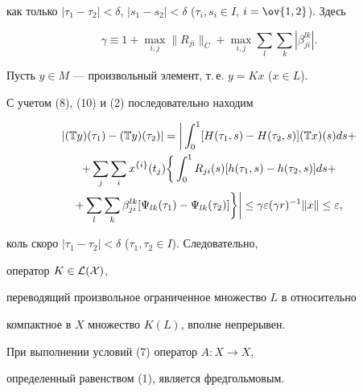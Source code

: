 \begin{pf}
\begin{equation}
\end{equation} 


как только $|\tau_1-\tau_2|<\delta$, $|s_1-s_2|<\delta$ ($\tau_i,s_i\in 


I$, $i=\ov{1,2}$). Здесь 


$$ 


\gamma\equiv 1+\max_{i,j}\|R_{j i}\|_C+\max_{i,j}\sum_l 


\sum_k|\beta^{l k}_{j i}|. 


$$ 


Пусть $y\in M$ --- произвольный элемент, т.\,е. $y=K x$ ($x\in L$). 


С учетом (8), (10) и (2) последовательно находим 


\begin{multline*} 


|(\Bbb T y)(\tau_1)-(\Bbb T y)(\tau_2)|=\bigg|\int^1_0 


[H(\tau_1,s)-H(\tau_2,s)](\Bbb T x)(s)ds+ \\ 


% 


+\sum_j\sum_i x^{\{i\}}(t_j)\bigg\{\int^1_0 R_{j i}(s) 


[h(\tau_1,s)-h(\tau_2,s)]ds + \\ 


% 


+\sum_l\sum_k \beta^{l k}_{j i}[\Psi_{l k}(\tau_1)- 


\Psi_{l k}(\tau_2)]\bigg\}\bigg|\le\gamma\varepsilon(\gamma r)^{-1} 


\|x\|\le\varepsilon, 


\end{multline*} 


коль скоро $|\tau_1-\tau_2|<\delta$ ($\tau_1,\tau_2\in I$). Следовательно, 


оператор $K\in\cal L(X)$, 


переводящий произвольное ограниченное множество $L$ в относительно 


компактное в $X$ множество $K(L)$, вполне непрерывен. 


\end{pf} 


 


\begin{cor} 


При выполнении условий (7) оператор $A:X\to X$,


определенный равенством (1), является фредгольмовым. 


\end{cor} 


